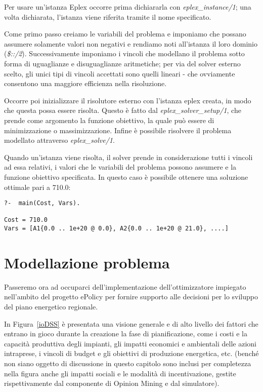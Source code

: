Per usare un'istanza Eplex occorre prima dichiararla con \emph{eplex\_instance/1}; una volta dichiarata, l'istanza viene riferita tramite il nome specificato. 

Come primo passo creiamo le variabili del problema e imponiamo che possano assumere solamente valori non negativi e rendiamo noti all'istanza il loro dominio (\emph{\$::/2}). Successivamente imponiamo i vincoli che modellano il problema sotto forma di uguaglianze e disuguaglianze aritmetiche; per via del solver esterno scelto, gli unici tipi di vincoli accettati sono quelli lineari - che ovviamente consentono una maggiore efficienza nella risoluzione.

Occorre poi inizializzare il risolutore esterno con l'istanza eplex creata, in modo che questa possa essere risolta. Questo è fatto dal \emph{eplex\_solver\_setup/1}, che prende come argomento la funzione obiettivo, la quale può essere di minimizzazione o massimizzazione. Infine è possibile risolvere il problema modellato attraverso \emph{eplex\_solve/1}.

Quando un'istanza viene risolta, il solver prende in considerazione tutti i vincoli ad essa relativi, i valori che le variabili del problema possono assumere e la funzione obiettivo specificata. In questo caso è possibile ottenere una soluzione ottimale pari a 710.0: 
\begin{lstlisting}
?-	main(Cost, Vars).

Cost = 710.0
Vars = [A1{0.0 .. 1e+20 @ 0.0}, A2{0.0 .. 1e+20 @ 21.0}, ....]
\end{lstlisting}

\section{Modellazione problema}

Passeremo ora ad occuparci dell'implementazione dell'ottimizzatore impiegato nell'ambito del progetto ePolicy per fornire supporto alle decisioni per lo sviluppo del piano energetico regionale.

In Figura~\ref{ioDSS} è presentata una visione generale e di alto livello dei fattori che entrano in gioco durante la creazione la fase di pianificazione, come i costi e la capacità produttiva degli impianti, gli impatti economici e ambientali delle azioni intraprese, i vincoli di budget e gli obiettivi di produzione energetica, etc. (benché non siano oggetto di discussione in questo capitolo sono inclusi per completezza nella figura anche gli impatti sociali e le modalità di incentivazione, gestite rispettivamente dal componente di Opinion Mining e dal simulatore).

